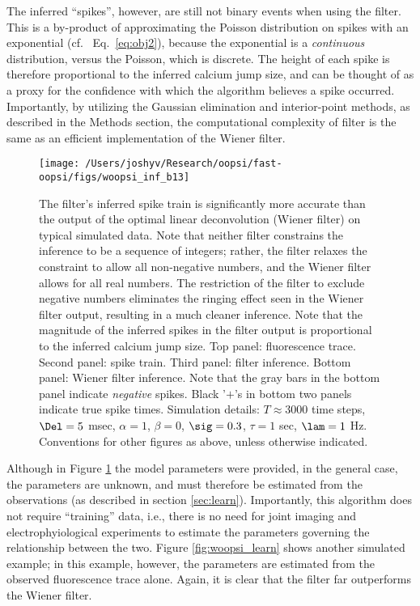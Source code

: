 The inferred ``spikes'', however, are still not binary events when using the \foopsi filter.  This is a by-product of approximating the Poisson distribution on spikes with an exponential (cf.~ Eq.~\eqref{eq:obj2}), because the exponential is a \emph{continuous} distribution, versus the Poisson, which is discrete.  The height of each spike is therefore proportional to the inferred calcium jump size, and can be thought of as a proxy for the confidence with which the algorithm believes a spike occurred.   Importantly, by utilizing the Gaussian elimination and interior-point methods, as described in the Methods section, the computational complexity of \foopsi filter is the same as an efficient implementation of the Wiener filter.  




\begin{figure}[h!]
\centering \texttt{[image: /Users/joshyv/Research/oopsi/fast-oopsi/figs/woopsi\_inf\_b13]}
\caption[\foopsi filter outperforms Wiener filter]{The \foopsi filter's inferred spike train is significantly more accurate than the output of the optimal linear deconvolution (Wiener filter) on typical simulated data. Note that neither filter constrains the inference to be a sequence of integers; rather, the \foopsi filter relaxes the constraint to allow all non-negative numbers, and the Wiener filter allows for all real numbers.  The restriction of the \foopsi filter to exclude negative numbers eliminates the ringing effect seen in the Wiener filter output, resulting in a much cleaner inference.  Note that the magnitude of the inferred spikes in the \foopsi filter output is proportional to the inferred calcium jump size.  Top panel: fluorescence trace.  Second panel: spike train.  Third panel: \foopsi filter inference.  Bottom panel: Wiener filter inference.  Note that the gray bars in the bottom panel indicate \emph{negative} spikes. Black '$+$'s in bottom two panels indicate true spike times.  Simulation details: $T\approx 3000$ time steps, $\Del=5$ msec, $\alpha=1$, $\beta=0$, $\sig=0.3$, $\tau=1$ sec, $\lam=1$ Hz. Conventions for other figures as above, unless otherwise indicated.} \label{fig:woopsi_inf}
\end{figure}


Although in Figure \ref{fig:woopsi_inf} the model parameters were provided, in the general case, the parameters are unknown, and must therefore be estimated from the observations (as described in section \ref{sec:learn}). Importantly, this algorithm does not require ``training'' data, i.e., there is no need for joint imaging and electrophyiological experiments to estimate the parameters governing the relationship between the two.  Figure \ref{fig:woopsi_learn} shows another simulated example; in this example, however, the parameters are estimated from the observed fluorescence trace alone.  Again, it is clear that the \foopsi filter far outperforms the Wiener filter.

